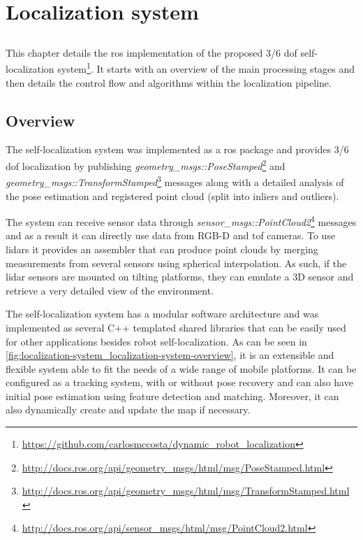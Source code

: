 \chapter{Localization system} \label{chap:localization-system}



\section*{}

This chapter details the \gls{ros} implementation of the proposed 3/6 \gls{dof} self-localization system\footnote{\url{https://github.com/carlosmccosta/dynamic_robot_localization}}. It starts with an overview of the main processing stages and then details the control flow and algorithms within the localization pipeline.



\section{Overview}

The self-localization system was implemented as a \gls{ros} package and provides 3/6 \gls{dof} localization by publishing \emph{geometry\_msgs::PoseStamped}\footnote{\url{http://docs.ros.org/api/geometry_msgs/html/msg/PoseStamped.html}} and \emph{geometry\_msgs::TransformStamped}\footnote{\url{http://docs.ros.org/api/geometry_msgs/html/msg/TransformStamped.html}} messages along with a detailed analysis of the pose estimation and registered point cloud (split into inliers and outliers).

The system can receive sensor data through \emph{sensor\_msgs::PointCloud2}\footnote{\url{http://docs.ros.org/api/sensor_msgs/html/msg/PointCloud2.html}} messages and as a result it can directly use data from RGB-D and \gls{tof} cameras. To use \glspl{lidar} it provides an assembler that can produce point clouds by merging measurements from several sensors using spherical interpolation. As such, if the \gls{lidar} sensors are mounted on tilting platforms, they can emulate a 3D sensor and retrieve a very detailed view of the environment.

The self-localization system has a modular software architecture and was implemented as several C++ templated shared libraries that can be easily used for other applications besides robot self-localization. As can be seen in \cref{fig:localization-system_localization-system-overview}, it is an extensible and flexible system able to fit the needs of a wide range of mobile platforms. It can be configured as a tracking system, with or without pose recovery and can also have initial pose estimation using feature detection and matching. Moreover, it can also dynamically create and update the map if necessary.

